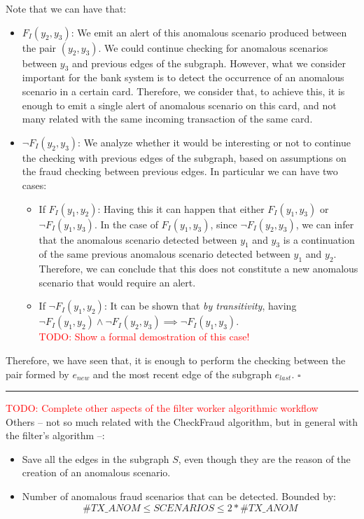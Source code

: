 \documentclass{article}
\begin{document}
Note that we can have that:
\begin{itemize}
    \item $F_I(y_2,y_3)$: We emit an alert of this anomalous scenario produced between the pair $(y_2,y_3)$. We could continue checking for anomalous scenarios between $y_3$ and previous edges of the subgraph. However, what we consider important for the bank system is to detect the occurrence of an anomalous scenario in a certain card. Therefore, we consider that, to achieve this, it is enough to emit a single alert of anomalous scenario on this card, and not many related with the same incoming transaction of the same card.
    \item $\neg F_I(y_2,y_3)$: We analyze whether it would be interesting or not to continue the checking with previous edges of the subgraph, based on assumptions on the fraud checking between previous edges. In particular we can have two cases:
    \begin{itemize}
        \item If $F_I(y_1,y_2)$: Having this it can happen that either $F_I(y_1,y_3)$ or $\neg F_I(y_1,y_3)$. In the case of $F_I(y_1,y_3)$, since $\neg F_I(y_2,y_3)$, we can infer that the anomalous scenario detected between $y_1$ and $y_3$ is a continuation of the same previous anomalous scenario detected between $y_1$ and $y_2$. Therefore, we can conclude that this does not constitute a new anomalous scenario that would require an alert.
        \item If $\neg F_I(y_1,y_2)$: It can be shown that \emph{by transitivity}, having \\
        $\neg F_I(y_1,y_2) \land \neg F_I(y_2,y_3)
        \implies \neg F_I(y_1,y_3)$. \\
        \textcolor{red}{TODO: Show a formal demostration of this case!}
    \end{itemize}
\end{itemize}

Therefore, we have seen that, it is enough to perform the checking between the pair formed by $e_{new}$ and the most recent edge of the subgraph $e_{last}$. $\square$


\textcolor{red}{\rule{\textwidth}{1mm}}
\textcolor{red}{TODO: Complete other aspects of the filter worker algorithmic workflow\\}
Others -- not so much related with the CheckFraud algorithm, but in general with the filter's algorithm --:
\begin{itemize}
    \item Save all the edges in the subgraph $S$, even though they are the reason of the creation of an anomalous scenario.
    \item Number of anomalous fraud scenarios that can be detected. Bounded by:
    $$\#TX\_ANOM \leq SCENARIOS \leq 2*\#TX\_ANOM$$
\end{itemize}
\end{document}
